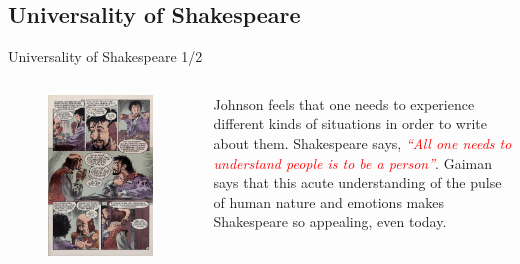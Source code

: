 \documentclass{beamer}
\begin{document}
  \subsection{Universality of Shakespeare}
  \begin{frame}{Universality of Shakespeare 1/2}
    \begin{columns}[c]
      \begin{figure}[htp]
        \begin{center}
          \centering
          \includegraphics[scale=0.3]{../Presentation/universality.jpg}
        \end{center}
      \end{figure}
      Johnson feels that one needs to experience different kinds of situations in order to write about them. Shakespeare says, \textcolor{red}{\emph{``All one needs to understand people is to be a person''}}. Gaiman says that this acute understanding of the pulse of human nature and emotions makes Shakespeare so appealing, even today.

\end{columns}
\end{frame}
\end{document}
